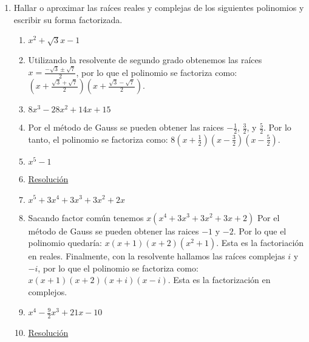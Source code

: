 \documentclass[a4paper]{article}
\newcommand{\answer}{\item[**]}
\newcommand{\exercise}{\item}
\newcommand{\df}[2]{\displaystyle\frac{#1}{#2}}
\begin{document}
\begin{enumerate}
\begin{enumerate} [label=(\alph*)]
		\item $Q(\gamma)=P(4)$ ~~~~con $P(x)=x-1$ ~~~~y $Q(x)=2x^2-4x$
		\answer $Q(\gamma)=2 \gamma^2-4\gamma = (4)-1= P(4)$ por lo que obtenemos la ecuación $2 \gamma^2-4\gamma -3 = 0$, de donde despejamos los valores de $\gamma = 1 \pm \sqrt{\df{5}{2}}$.

		\item $3x^2+\gamma x+4$ tiene a 1 como raíz
		\answer $\gamma=-7$. \href{https://youtu.be/09D5Z3dcaXc}{Resolución}

		\item $x^3+\alpha x^2+\beta x+5$ es divisible por $Q(x)=x^2+x+1$
		\answer $\alpha=6$ y $\beta=6$. \href{https://youtu.be/jE5a43IQ91E}{Resolución}

	\end{enumerate}

	\exercise Hallar o aproximar las raíces reales y complejas de los siguientes polinomios y escribir su forma factorizada. 

	\begin{multicols}{2}
	\begin{enumerate} [label=(\alph*)]
		
		\item $x^2+\sqrt{3}x-1$
		\answer Utilizando la resolvente de segundo grado obtenemos las raíces $x=\df{-\sqrt{3}\pm\sqrt{7}}{2}$, por lo que el polinomio se factoriza como: $\left(x+\df{\sqrt{3}+\sqrt{7}}{2}\right)\left(x+\df{\sqrt{3}-\sqrt{7}}{2}\right)$.

		\item $8x^3-28x^2+14x+15$
		\answer Por el método de Gauss se pueden obtener las raices $-\df{1}{2}$, $\df{3}{2}$, y $\df{5}{2}$. Por lo tanto, el polinomio se factoriza como: $8\left(x+\df{1}{2}\right)\left(x-\df{3}{2}\right)\left(x-\df{5}{2}\right)$.

		\item $x^5-1$
		\answer \href{https://youtu.be/ZMBXAdxOleM}{Resolución}

		\item $x^5+3x^4+3x^3+3x^2+2x$
		\answer Sacando factor común tenemos $x(x^4+3x^3+3x^2+3x+2)$ Por el método de Gauss se pueden obtener las raices $-1$ y $-2$. Por lo que el polinomio quedaría: $x(x+1)(x+2)(x^2+1)$. Esta es la factoriación en reales. Finalmente, con la resolvente hallamos las raíces complejas $i$ y $-i$, por lo que el polinomio se factoriza como: $x(x+1)(x+2)(x+i)(x-i)$. Esta es la factorización en complejos.
		
		\item $x^4-\df{9}{2}x^3+21x-10$
		\answer \href{https://youtu.be/1V06bnuaadA}{Resolución}


\end{enumerate}
\end{multicols}
\end{enumerate}
\end{document}
